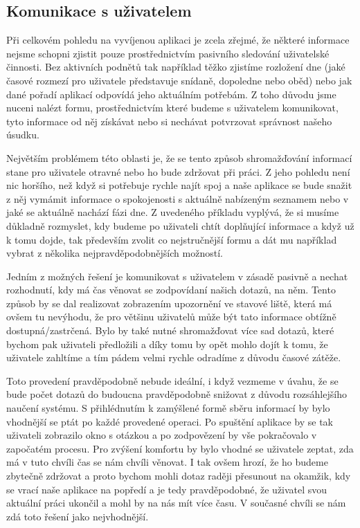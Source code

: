 \documentclass[thesis=M,czech]{FITthesis}[2012/06/26]
\begin{document}
\subsection{Komunikace s uživatelem}
Při celkovém pohledu na vyvíjenou aplikaci je zcela zřejmé, že některé informace nejsme schopni zjistit pouze prostřednictvím pasivního sledování uživatelské činnosti. Bez aktivních podnětů tak například těžko zjistíme rozložení dne (jaké časové rozmezí pro uživatele představuje snídaně, dopoledne nebo oběd) nebo jak dané pořadí aplikací odpovídá jeho aktuálním potřebám. Z toho důvodu jsme nuceni nalézt formu, prostřednictvím které budeme s uživatelem komunikovat, tyto informace od něj získávat nebo si nechávat potvrzovat správnost našeho úsudku.

Největším problémem této oblasti je, že se tento způsob shromažďování informací stane pro uživatele otravné nebo ho bude zdržovat při práci. Z jeho pohledu není nic horšího, než když si potřebuje rychle najít spoj a naše aplikace se bude snažit z něj vymámit informace o spokojenosti s aktuálně nabízeným seznamem nebo v jaké se aktuálně nachází fázi dne. Z uvedeného příkladu vyplývá, že si musíme důkladně rozmyslet, kdy budeme po uživateli chtít doplňující informace a když už k tomu dojde, tak především zvolit co nejstručnější formu a dát mu například vybrat z několika nejpravděpodobnějších možností.

Jedním z možných řešení je komunikovat s uživatelem v zásadě pasivně a nechat rozhodnutí, kdy má čas věnovat se zodpovídaní našich dotazů, na něm. Tento způsob by se dal realizovat zobrazením upozornění ve stavové liště, která má ovšem tu nevýhodu, že pro většinu uživatelů může být tato informace obtížně dostupná/zastrčená. Bylo by také nutné shromažďovat více sad dotazů, které bychom pak uživateli předložili a díky tomu by opět mohlo dojít k tomu, že uživatele zahltíme a tím pádem velmi rychle odradíme z důvodu časové zátěže.

Toto provedení pravděpodobně nebude ideální, i když vezmeme v úvahu, že se bude počet dotazů do budoucna pravděpodobně snižovat z důvodu rozsáhlejšího naučení systému. S přihlédnutím k zamýšlené formě sběru informací by bylo vhodnější se ptát po každé provedené operaci. Po spuštění aplikace by se tak uživateli zobrazilo okno s otázkou a po zodpovězení by vše pokračovalo v započatém procesu. Pro zvýšení komfortu by bylo vhodné se uživatele zeptat, zda má v tuto chvíli čas se nám chvíli věnovat. I tak ovšem hrozí, že ho budeme zbytečně zdržovat a proto bychom mohli dotaz raději přesunout na okamžik, kdy se vrací naše aplikace na popředí a je tedy pravděpodobné, že uživatel svou aktuální práci ukončil a mohl by na nás mít více času. V současné chvíli se nám zdá toto řešení jako nejvhodnější.
\end{document}
